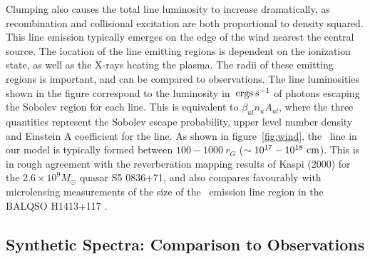 \documentclass[useAMS,usenatbib]{mn2e_x}
\begin{document}
Clumping also causes the total line luminosity to increase dramatically,
as recombination and collisional excitation are both proportional to
density squared. This line emission typically emerges on the edge of the wind
nearest the central source. The location of the line emitting regions
is dependent on the ionization state, as well as the X-rays heating the plasma.
The radii of these emitting regions is important,
and can be compared to observations. The line luminosities 
shown in the figure correspond to the luminosity in $\:{\rm ergs\:s^{-1}}$ of photons
escaping the Sobolev region for each line. 
This is equivalent to $\beta_{ul} n_u A_{ul}$, where the three quantities
represent the Sobolev escape probability, upper level number density and 
Einstein A coefficient for the line. 
As shown in figure~\ref{fig:wind},
the \civ\ line in our model is typically formed between 
$100-1000~r_G$ ($\sim10^{17}-10^{18}~\rm{cm}$).
This is in rough agreement with the reverberation mapping 
results of Kaspi (2000) for the $2.6\times10^{9} M_\odot$ quasar S5 0836+71,
and also compares favourably with microlensing measurements of the size of the
\civ\ emission line region in the BALQSO H1413+117 \citep{odowd2015}.

\subsection{Synthetic Spectra: Comparison to Observations}
\end{document}
